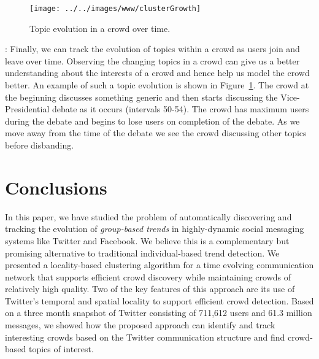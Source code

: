 \documentclass{sig-alternate}
\begin{document}
\begin{figure}[!t]
\begin{center}
\texttt{[image: ../../images/www/clusterGrowth]}
\caption{Topic evolution in a crowd over time.}
\label{fig:topic-time}
\end{center}
\end{figure}

 
\medskip{}: Finally, we can track the evolution of topics within a crowd as users join and leave over time. Observing the changing topics in a crowd can give us a
better understanding about the interests of a crowd and hence help us model the
crowd better. An example of such a topic evolution is shown in
Figure~\ref{fig:topic-time}. The crowd at the beginning discusses something
generic and then starts discussing the Vice-Presidential debate as it occurs
(intervals 50-54). The crowd has maximum users during the debate and begins to
lose users on completion of the debate. As we move away from the time of the debate
we see the crowd discussing other topics before disbanding. %





\section{Conclusions}
\label{sec:conclusions}
In this paper, we have studied the problem of automatically discovering and
tracking the evolution of \textit{group-based trends} in highly-dynamic social
messaging systems like Twitter and Facebook. We believe this is a complementary
but promising alternative to traditional individual-based trend detection. We
presented a locality-based clustering algorithm for a time evolving communication
network that supports efficient crowd discovery while maintaining crowds of
relatively high quality. Two of the key features of this approach are its use of
Twitter's temporal and spatial locality to support efficient crowd detection.
Based on a three month snapshot of Twitter consisting of
 711,612 users and 61.3 million messages, we showed how the proposed approach can
 identify and track interesting crowds based on the Twitter communication
 structure and find crowd-based topics of interest.
\end{document}
